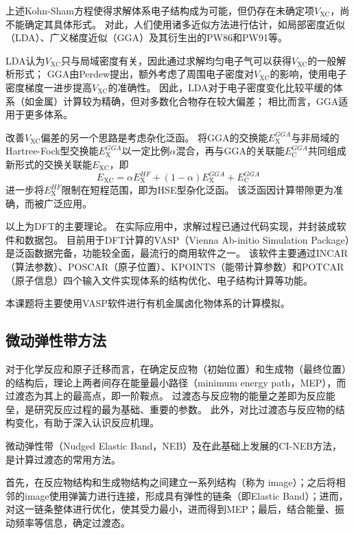 上述Kohn-Sham方程使得求解体系电子结构成为可能，但仍存在未确定项$V_{\mathrm{XC}}$，尚不能确定其具体形式。
对此，人们使用诸多近似方法进行估计，如局部密度近似（LDA）、广义梯度近似（GGA）及其衍生出的PW86和PW91等。

LDA认为$V_{\mathrm{XC}}$只与局域密度有关，因此通过求解均匀电子气可以获得$V_{\mathrm{XC}}$的一般解析形式；
GGA由Perdew提出，额外考虑了周围电子密度对$V_{\mathrm{XC}}$的影响，使用电子密度梯度一进步提高$V_{\mathrm{XC}}$的准确性。
因此，LDA对于电子密度变化比较平缓的体系（如金属）计算较为精确，但对多数化合物存在较大偏差；
相比而言，GGA适用于更多体系。

改善$V_{\mathrm{XC}}$偏差的另一个思路是考虑杂化泛函。
将GGA的交换能$E^{GGA}_{\mathrm{X}}$与非局域的Hartree-Fock型交换能$E^{GGA}_{\mathrm{X}}$以一定比例$\alpha$混合，再与GGA的关联能$E^{GGA}_{\mathrm{C}}$共同组成新形式的交换关联能$E_{\mathrm{XC}}$，即
\begin{equation}
    E_{\mathrm{XC}}=\alpha E^{HF}_{\mathrm{X}}+(1-\alpha)E^{GGA}_{\mathrm{X}}+E^{GGA}_{\mathrm{C}}
\end{equation}
进一步将$E^{HF}_{\mathrm{X}}$限制在短程范围，即为HSE型杂化泛函。
该泛函因计算带隙更为准确，而被广泛应用。

以上为DFT的主要理论。
在实际应用中，求解过程已通过代码实现，并封装成软件和数据包。
目前用于DFT计算的VASP（Vienna Ab-initio Simulation Package）是泛函数据完备，功能较全面，最流行的商用软件之一。
该软件主要通过INCAR（算法参数）、POSCAR（原子位置）、KPOINTS（能带计算参数）和POTCAR（原子信息）四个输入文件实现体系的结构优化、电子结构计算等功能。

本课题将主要使用VASP软件进行有机金属卤化物体系的计算模拟。

\subsection{微动弹性带方法}

对于化学反应和原子迁移而言，在确定反应物（初始位置）和生成物（最终位置）的结构后，理论上两者间存在能量最小路径（minimum energy path，MEP），而过渡态为其上的最高点，即一阶鞍点。
过渡态与反应物的能量之差即为反应能垒，是研究反应过程的最为基础、重要的参数。
此外，对比过渡态与反应物的结构变化，有助于深入认识反应机理。

微动弹性带（Nudged Elastic Band，NEB）及在此基础上发展的CI-NEB方法，是计算过渡态的常用方法。

首先，在反应物结构和生成物结构之间建立一系列结构（称为 image）；之后将相邻的image使用弹簧力进行连接，形成具有弹性的链条（即Elastic Band）；进而，对这一链条整体进行优化，使其受力最小，进而得到MEP；最后，结合能量、振动频率等信息，确定过渡态。

